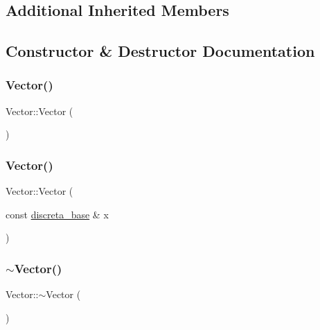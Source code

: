 \subsection*{Additional Inherited Members}


\subsection{Constructor \& Destructor Documentation}
\mbox{\label{class_vector_a6f80c73b5f18dcf3f8e36065bdc8b9e5}} 
\subsubsection{\texorpdfstring{Vector()}{Vector()}\hspace{0.1cm}{\footnotesize\ttfamily [1/2]}}
{\footnotesize\ttfamily Vector\+::\+Vector (\begin{DoxyParamCaption}{ }\end{DoxyParamCaption})}

\mbox{\label{class_vector_a1d3c54bac484f186107205c9bc41a187}} 
\subsubsection{\texorpdfstring{Vector()}{Vector()}\hspace{0.1cm}{\footnotesize\ttfamily [2/2]}}
{\footnotesize\ttfamily Vector\+::\+Vector (\begin{DoxyParamCaption}\item[{const \mbox{\hyperlink{classdiscreta__base}{discreta\+\_\+base}} \&}]{x }\end{DoxyParamCaption})}

\mbox{\label{class_vector_a2eb3c49587a4f12cade7895ccb73f6a0}} 
\subsubsection{\texorpdfstring{$\sim$\+Vector()}{~Vector()}}
{\footnotesize\ttfamily Vector\+::$\sim$\+Vector (\begin{DoxyParamCaption}{ }\end{DoxyParamCaption})}



